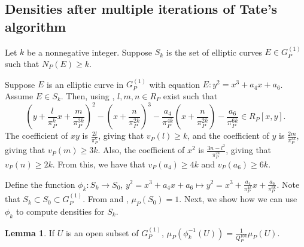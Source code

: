 \documentclass[12pt,letterpaper]{amsart}
\theoremstyle{definition}
\newtheorem{lemma}[theorem]{Lemma}
\begin{document}
\subsection{Densities after multiple iterations of Tate's algorithm}

Let $k$ be a nonnegative integer. Suppose $S_k$ is the set of elliptic curves $E\in G_P^{(1)}$ such that $N_P(E)\geq k$.

Suppose $E$ is an elliptic curve in $G_P^{(1)}$ with equation $E:y^2=x^3+a_4x+a_6$. Assume $E\in S_k$. Then, using , $l,m,n\in R_P$ exist such that 
\[
    \left(y+\frac{l}{\pi_P^k}x+\frac{m}{\pi_P^{3k}}\right)^2-\left(x+\frac{n}{\pi_P^{2k}}\right)^3-\frac{a_4}{\pi_P^{4k}}\left(x+\frac{n}{\pi_P^{2k}}\right)-\frac{a_6}{\pi_P^{6k}}\in R_P[x,y].
\]
The coefficient of $xy$ is $\frac{2l}{\pi_P^k}$, giving that $v_P(l)\geq k$, and the coefficient of $y$ is $\frac{2m}{\pi_P^{3k}}$, giving that $v_P(m)\geq 3k$. Also, the coefficient of $x^2$ is $\frac{3n-l^2}{\pi_P^{2k}}$, giving that $v_P(n)\geq 2k$. From this, we have that $v_P(a_4)\geq 4k$ and $v_P(a_6)\geq 6k$. 

Define the function $\phi_k: S_k\rightarrow S_0$, $y^2=x^3+a_4x+a_6\mapsto y^2=x^3+\frac{a_4}{\pi_P^{4k}}x+\frac{a_6}{\pi_P^{6k}}$. Note that $S_k\subset S_0\subset G_P^{(1)}$. From  and , $\mu_P(S_0)=1$. Next, we show how we can use $\phi_k$ to compute densities for $S_k$.

\begin{lemma}
\label{invdensitymult1}
If $U$ is an open subset of $G_P^{(1)}$, $\mu_P(\phi_k^{-1}(U))=\frac{1}{Q_P^{10k}}\mu_P(U)$.
\end{lemma}
\end{document}
